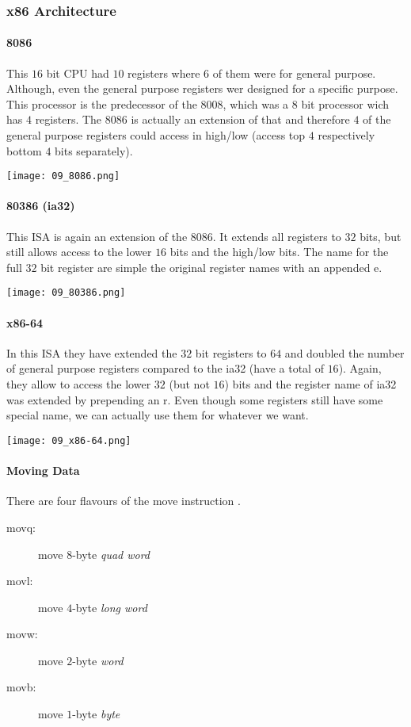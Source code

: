 \subsubsection{x86 Architecture}
\paragraph{8086}
This $16$ bit CPU had $10$ registers where $6$ of them were for general purpose. Although, even the general purpose registers wer designed for a specific purpose. This processor is the predecessor of the 8008, which was a $8$ bit processor wich has $4$ registers. The 8086 is actually an extension of that and therefore $4$ of the general purpose registers could access in high/low (access top $4$ respectively bottom $4$ bits separately).

\texttt{[image: 09\_8086.png]}

\paragraph{80386 (ia32)}
This ISA is again an extension of the 8086. It extends all registers to $32$ bits, but still allows access to the lower $16$ bits and the high/low bits. The name for the full $32$ bit register are simple the original register names with an appended e.

\texttt{[image: 09\_80386.png]}

\paragraph{x86-64}
In this ISA they have extended the $32$ bit registers to $64$ and doubled the number of general purpose registers compared to the ia32 (have a total of $16$). Again, they allow to access the lower $32$ (but not $16$) bits and the register name of ia32 was extended by prepending an r. Even though some registers still have some special name, we can actually use them for whatever we want.

\texttt{[image: 09\_x86-64.png]}

\paragraph{Moving Data}
There are four flavours of the move instruction .
\begin{description}
    \item[movq:] move $8$-byte \textit{quad word}
    \item[movl:] move $4$-byte \textit{long word}
    \item[movw:] move $2$-byte \textit{word}
    \item[movb:] move $1$-byte \textit{byte}
\end{description}

